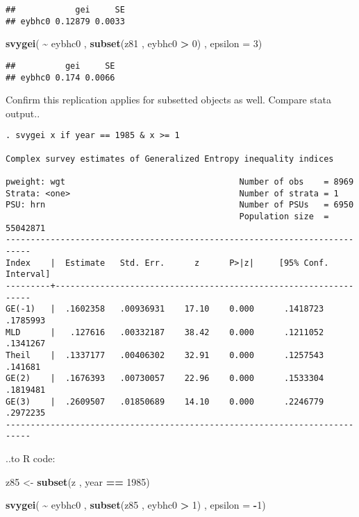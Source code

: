 \documentclass[
]{book}
\newenvironment{Shaded}{\begin{snugshade}}{\end{snugshade}}
\newcommand{\AttributeTok}[1]{\textcolor[rgb]{0.13,0.29,0.53}{#1}}
\newcommand{\DecValTok}[1]{\textcolor[rgb]{0.00,0.00,0.81}{#1}}
\newcommand{\FunctionTok}[1]{\textcolor[rgb]{0.13,0.29,0.53}{\textbf{#1}}}
\newcommand{\NormalTok}[1]{#1}
\newcommand{\OtherTok}[1]{\textcolor[rgb]{0.56,0.35,0.01}{#1}}
\newcommand{\SpecialCharTok}[1]{\textcolor[rgb]{0.81,0.36,0.00}{\textbf{#1}}}
\begin{document}
\begin{verbatim}
##            gei     SE
## eybhc0 0.12879 0.0033
\end{verbatim}

\begin{Shaded}
\begin{Highlighting}[]
\FunctionTok{svygei}\NormalTok{( }\SpecialCharTok{\textasciitilde{}}\NormalTok{ eybhc0 , }\FunctionTok{subset}\NormalTok{(z81 , eybhc0 }\SpecialCharTok{\textgreater{}} \DecValTok{0}\NormalTok{) , }\AttributeTok{epsilon =} \DecValTok{3}\NormalTok{)}
\end{Highlighting}
\end{Shaded}

\begin{verbatim}
##          gei     SE
## eybhc0 0.174 0.0066
\end{verbatim}

Confirm this replication applies for subsetted objects as well. Compare stata output..

\begin{verbatim}
. svygei x if year == 1985 & x >= 1

Complex survey estimates of Generalized Entropy inequality indices
 
pweight: wgt                                   Number of obs    = 8969
Strata: <one>                                  Number of strata = 1
PSU: hrn                                       Number of PSUs   = 6950
                                               Population size  = 55042871
---------------------------------------------------------------------------
Index    |  Estimate   Std. Err.      z      P>|z|     [95% Conf. Interval]
---------+-----------------------------------------------------------------
GE(-1)   |  .1602358   .00936931    17.10    0.000      .1418723   .1785993
MLD      |   .127616   .00332187    38.42    0.000      .1211052   .1341267
Theil    |  .1337177   .00406302    32.91    0.000      .1257543    .141681
GE(2)    |  .1676393   .00730057    22.96    0.000      .1533304   .1819481
GE(3)    |  .2609507   .01850689    14.10    0.000      .2246779   .2972235
---------------------------------------------------------------------------
\end{verbatim}

..to R code:

\begin{Shaded}
\begin{Highlighting}[]
\NormalTok{z85 }\OtherTok{\textless{}{-}} \FunctionTok{subset}\NormalTok{(z , year }\SpecialCharTok{==} \DecValTok{1985}\NormalTok{)}

\FunctionTok{svygei}\NormalTok{( }\SpecialCharTok{\textasciitilde{}}\NormalTok{ eybhc0 , }\FunctionTok{subset}\NormalTok{(z85 , eybhc0 }\SpecialCharTok{\textgreater{}} \DecValTok{1}\NormalTok{) , }\AttributeTok{epsilon =} \SpecialCharTok{{-}}\DecValTok{1}\NormalTok{)}
\end{Highlighting}
\end{Shaded}
\end{document}
